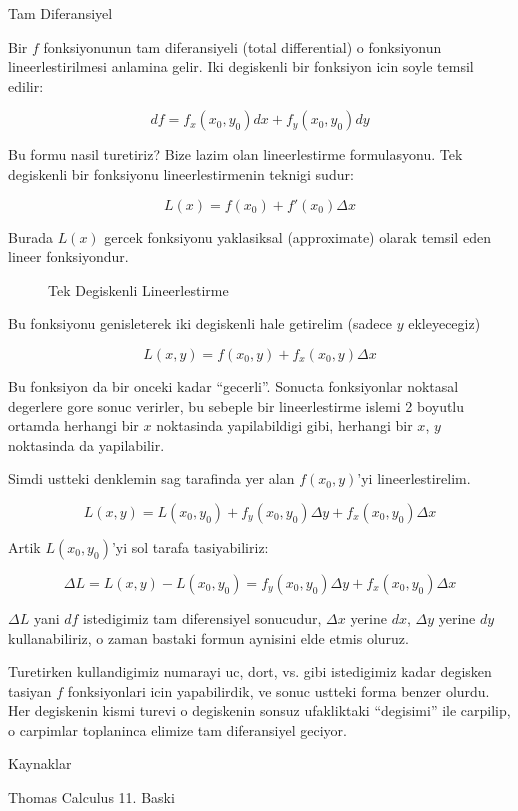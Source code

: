\documentclass[12pt,fleqn]{article}
\begin{document}
Tam Diferansiyel

Bir $f$ fonksiyonunun tam diferansiyeli (total differential) o
fonksiyonun lineerlestirilmesi anlamina gelir. Iki degiskenli bir
fonksiyon icin soyle temsil edilir:

\[ df = f_x(x_0, y_0)dx + f_y(x_0,y_0)dy  \]

Bu formu nasil turetiriz? Bize lazim olan lineerlestirme formulasyonu. Tek
degiskenli bir fonksiyonu lineerlestirmenin teknigi sudur:

\[ L(x) = f(x_0) + f'(x_0) \Delta x  \]

Burada $L(x)$ gercek fonksiyonu yaklasiksal (approximate) olarak temsil eden
lineer fonksiyondur. 

\begin{figure}[!hbp]
\caption{Tek Degiskenli Lineerlestirme}
\end{figure}

Bu fonksiyonu genisleterek iki degiskenli hale getirelim (sadece $y$
ekleyecegiz)

\[ L(x,y) = f(x_0,y) + f_x(x_0,y) \Delta x \]

Bu fonksiyon da bir onceki kadar ``gecerli''. Sonucta fonksiyonlar
noktasal degerlere gore sonuc verirler, bu sebeple bir lineerlestirme
islemi 2 boyutlu ortamda herhangi bir $x$ noktasinda yapilabildigi
gibi, herhangi bir $x$, $y$ noktasinda da yapilabilir.

Simdi ustteki denklemin sag tarafinda yer alan $f(x_0,y)$'yi lineerlestirelim.  

\[ L(x,y) = L(x_0,y_0) + f_y(x_0,y_0) \Delta y + f_x(x_0,y_0) \Delta x \]

Artik $L(x_0,y_0)$'yi sol tarafa tasiyabiliriz:

\[ \Delta L = L(x,y) - L(x_0,y_0) = f_y(x_0,y_0) \Delta y + f_x(x_0,y_0) \Delta x \]

$\Delta L$ yani $df$ istedigimiz tam diferensiyel sonucudur, $\Delta
x$ yerine $dx$, $\Delta y$ yerine $dy$ kullanabiliriz, o zaman bastaki
formun aynisini elde etmis oluruz.

Turetirken kullandigimiz numarayi uc, dort, vs. gibi istedigimiz kadar
degisken tasiyan $f$ fonksiyonlari icin yapabilirdik, ve sonuc ustteki
forma benzer olurdu. Her degiskenin kismi turevi o degiskenin sonsuz
ufakliktaki ``degisimi'' ile carpilip, o carpimlar toplaninca elimize
tam diferansiyel geciyor.

Kaynaklar

Thomas Calculus 11. Baski
\end{document}
